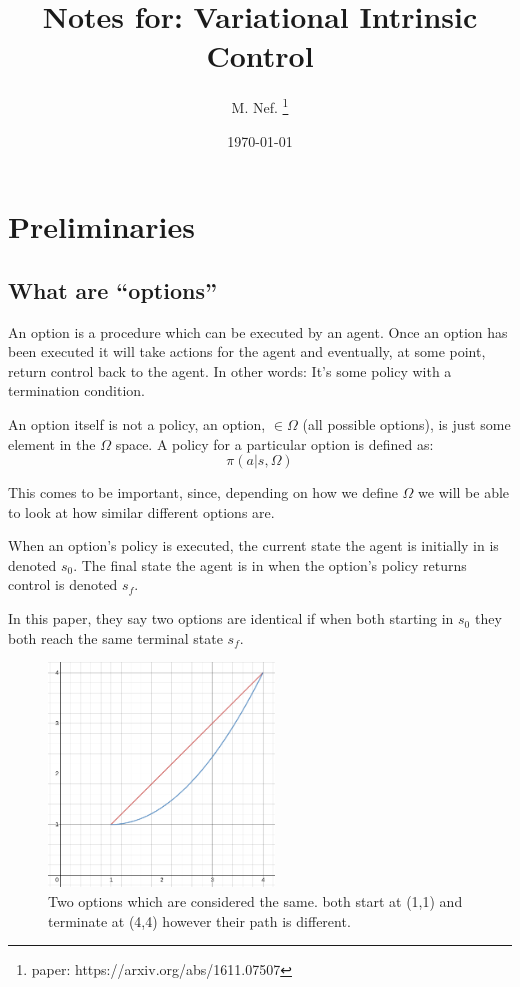 \documentclass{article}
\title{Notes for: Variational Intrinsic Control}
\author{M. Nef. \thanks{paper: https://arxiv.org/abs/1611.07507}}
\date{\today}
\begin{document}
\maketitle

\section{Preliminaries}

\subsection{What are ``options''}

An option is a procedure which can be executed by an agent. Once an option has been executed it will take actions for the agent and eventually, at some point, return control back to the agent. In other words: It's some policy with a termination condition.


An option itself is not a policy, an option, \(\in \Omega\) (all possible options), is just some element in the \(\Omega\) space.
A policy for a particular option is defined as:
\begin{equation}
  \label{eq:1}
  \pi(a | s, \Omega)
\end{equation}

This comes to be important, since, depending on how we define \(\Omega\) we will be able to look at how similar different options are.


When an option's policy is executed, the current state the agent is initially in is denoted \(s_{0}\). The final state the agent is in when the option's policy returns control is denoted \(s_{f}\).


In this paper, they say two options are identical if when both starting in \(s_{0}\) they both reach the same terminal state \(s_{f}\).


\begin{figure}[!ht]
\begin{center}
  \includegraphics[width=60mm]{images/same_options.png}
  \caption{Two options which are considered the same. both start at (1,1) and terminate at (4,4) however their path is different.}
\end{center}
\end{figure}
\end{document}
